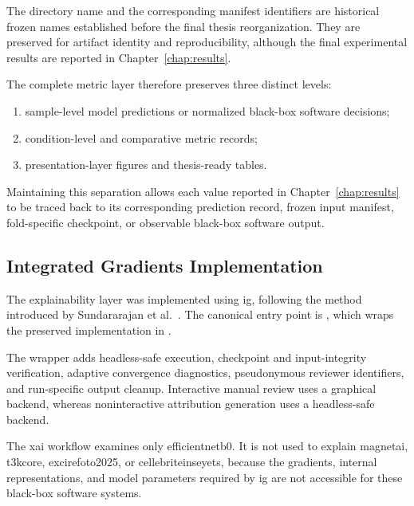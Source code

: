 The directory name  and the corresponding manifest
identifiers are historical frozen names established before the final thesis
reorganization. They are preserved for artifact identity and reproducibility,
although the final experimental results are reported in
Chapter~\ref{chap:results}.

The complete metric layer therefore preserves three distinct levels:

\begin{enumerate}
\item sample-level model predictions or normalized black-box software
decisions;
\item condition-level and comparative metric records;
\item presentation-layer figures and thesis-ready tables.
\end{enumerate}

Maintaining this separation allows each value reported in
Chapter~\ref{chap:results} to be traced back to its corresponding prediction
record, frozen input manifest, fold-specific checkpoint, or observable
black-box software output.

\subsection{Integrated Gradients Implementation}
\label{subsec:implementation-explainability}

The explainability layer was implemented using \gls{ig}, following the method
introduced by Sundararajan et al.~\cite{Sundararajan2017}. The canonical entry
point is
,
which wraps the preserved implementation in
.

The wrapper adds headless-safe execution, checkpoint and input-integrity
verification, adaptive convergence diagnostics, pseudonymous reviewer
identifiers, and run-specific output cleanup. Interactive manual review uses a
graphical backend, whereas noninteractive attribution generation uses a
headless-safe backend.

The \gls{xai} workflow examines only \gls{efficientnetb0}. It is not used
to explain \gls{magnetai}, \gls{t3kcore},
\gls{excirefoto2025}, or \gls{cellebriteinseyets}, because the gradients,
internal representations, and model parameters required by \gls{ig} are not
accessible for these black-box software systems.

